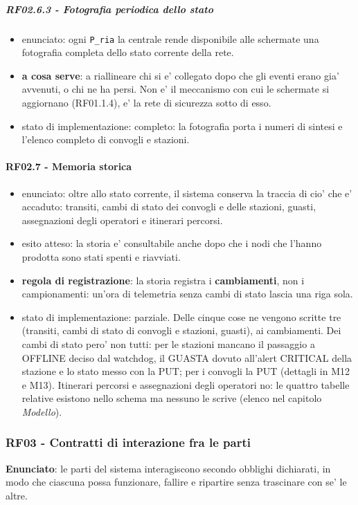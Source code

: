 \documentclass[11pt]{article}
\begin{document}
\subparagraph{RF02.6.3 - Fotografia periodica dello stato}
\label{sec:org688666b}
\begin{itemize}
\item enunciato: ogni \texttt{P\_ria} la centrale rende disponibile alle schermate una fotografia completa dello
stato corrente della rete.
\item \textbf{a cosa serve}: a riallineare chi si e' collegato dopo che gli eventi erano gia' avvenuti, o chi ne
ha persi. Non e' il meccanismo con cui le schermate si aggiornano (RF01.1.4), e' la rete di
sicurezza sotto di esso.
\item stato di implementazione: completo: la fotografia porta i numeri di sintesi e l'elenco completo
di convogli e stazioni.
\end{itemize}
\paragraph{RF02.7 - Memoria storica}
\label{sec:org59b0dea}

\begin{itemize}
\item enunciato: oltre allo stato corrente, il sistema conserva la traccia di cio' che e' accaduto:
transiti, cambi di stato dei convogli e delle stazioni, guasti, assegnazioni degli operatori e
itinerari percorsi.
\item esito atteso: la storia e' consultabile anche dopo che i nodi che l'hanno prodotta sono stati
spenti e riavviati.
\item \textbf{regola di registrazione}: la storia registra i \textbf{cambiamenti}, non i campionamenti: un'ora di
telemetria senza cambi di stato lascia una riga sola.
\item stato di implementazione: parziale. Delle cinque cose ne vengono scritte tre (transiti, cambi di
stato di convogli e stazioni, guasti), ai cambiamenti. Dei cambi di stato pero' non tutti: per le
stazioni mancano il passaggio a OFFLINE deciso dal watchdog, il GUASTA dovuto all'alert CRITICAL
della stazione e lo stato messo con la PUT; per i convogli la PUT (dettagli in M12 e M13).
Itinerari percorsi e assegnazioni degli operatori no: le quattro tabelle relative esistono nello schema ma nessuno le scrive (elenco nel
capitolo \emph{Modello}).
\end{itemize}
\subsubsection{RF03 - Contratti di interazione fra le parti}
\label{sec:orgbbbd5cf}
\textbf{Enunciato}: le parti del sistema interagiscono secondo obblighi dichiarati, in modo che ciascuna
possa funzionare, fallire e ripartire senza trascinare con se' le altre.
\end{document}

